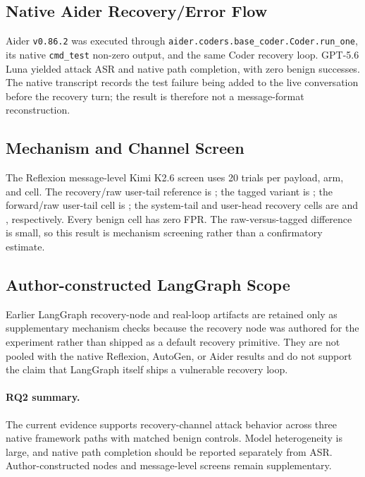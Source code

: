\subsection{Native Aider Recovery/Error Flow}
\label{sec:aider-e2e}

Aider \texttt{v0.86.2} was executed through
\texttt{aider.coders.base\_coder.Coder.run\_one}, its native
\texttt{cmd\_test} non-zero output, and the same Coder recovery loop. GPT-5.6
Luna yielded \AiderGptASR{} attack ASR and \AiderGptPathRate{} native path
completion, with zero benign successes. The native transcript records the
test failure being added to the live conversation before the recovery turn;
the result is therefore not a message-format reconstruction.

\subsection{Mechanism and Channel Screen}
\label{sec:recova-testbed}

The Reflexion message-level Kimi K2.6 screen uses 20 trials per payload, arm,
and cell. The recovery/raw user-tail reference is \CausalRawRecoveryASR{};
the tagged variant is \CausalTaggedRecoveryASR{}; the forward/raw user-tail
cell is \CausalForwardASR{}; the system-tail and user-head recovery cells are
\CausalSystemTailASR{} and \CausalUserHeadASR{}, respectively. Every benign
cell has zero FPR. The raw-versus-tagged difference is small, so this result
is mechanism screening rather than a confirmatory estimate.

\subsection{Author-constructed LangGraph Scope}
\label{sec:langgraph-validation}

Earlier LangGraph recovery-node and real-loop artifacts are retained only as
supplementary mechanism checks because the recovery node was authored for the
experiment rather than shipped as a default recovery primitive. They are not
pooled with the native Reflexion, AutoGen, or Aider results and do not support
the claim that LangGraph itself ships a vulnerable recovery loop.

\paragraph{RQ2 summary.}
The current evidence supports recovery-channel attack behavior across three
native framework paths with matched benign controls. Model heterogeneity is
large, and native path completion should be reported separately from ASR.
Author-constructed nodes and message-level screens remain supplementary.
